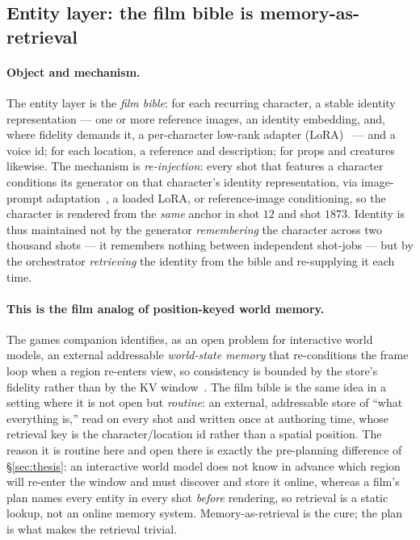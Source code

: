 \documentclass[11pt]{article}
\begin{document}
\subsection{Entity layer: the film bible is memory-as-retrieval}
\label{sec:entity}

\paragraph{Object and mechanism.} The entity layer is the \emph{film bible}: for each recurring character, a
stable identity representation --- one or more reference images, an identity embedding, and, where fidelity
demands it, a per-character low-rank adapter (LoRA)~\cite{lora,dreambooth} --- and a voice id; for each location,
a reference and description; for props and creatures likewise. The mechanism is \emph{re-injection}: every shot
that features a character conditions its generator on that character's identity representation, via image-prompt
adaptation~\cite{ipadapter}, a loaded LoRA, or reference-image conditioning, so the character is rendered from
the \emph{same} anchor in shot $12$ and shot $1873$. Identity is thus maintained not by the generator
\emph{remembering} the character across two thousand shots --- it remembers nothing between independent shot-jobs
--- but by the orchestrator \emph{retrieving} the identity from the bible and re-supplying it each time.

\paragraph{This is the film analog of position-keyed world memory.} The games companion identifies, as an open
problem for interactive world models, an external addressable \emph{world-state memory} that re-conditions the
frame loop when a region re-enters view, so consistency is bounded by the store's fidelity rather than by the KV
window~\cite{games}. The film bible is the same idea in a setting where it is not open but \emph{routine}: an
external, addressable store of ``what everything is,'' read on every shot and written once at authoring time,
whose retrieval key is the character/location id rather than a spatial position. The reason it is routine here
and open there is exactly the pre-planning difference of \S\ref{sec:thesis}: an interactive world model does not
know in advance which region will re-enter the window and must discover and store it online, whereas a film's plan
names every entity in every shot \emph{before} rendering, so retrieval is a static lookup, not an online memory
system. Memory-as-retrieval is the cure; the plan is what makes the retrieval trivial.
\end{document}
